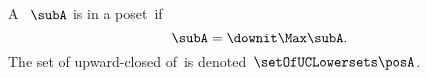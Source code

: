 \begin{definition}
    \label{def:upward-closed-lowerset}
    A ~$\subA$ is  in a poset~\posA if
    \begin{equation}
        \subA = \downit \Max \subA.
    \end{equation}
    The set of upward-closed  of~\posA is denoted~$\setOfUCLowersets \posA$.
\end{definition}
